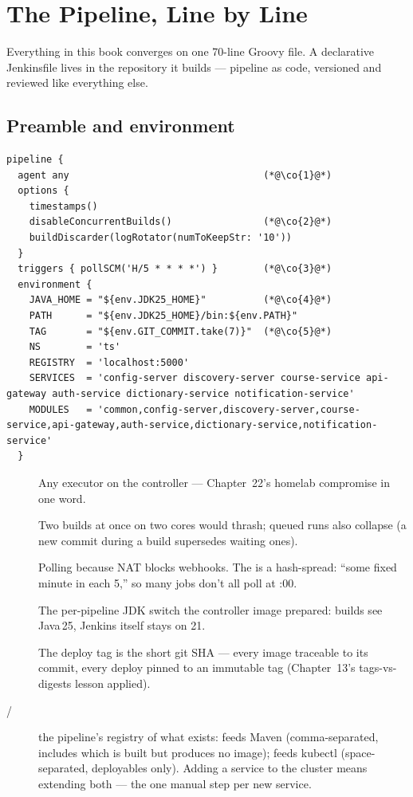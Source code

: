 \chapter{The Pipeline, Line by Line}
\label{ch:pipeline}

Everything in this book converges on one 70-line Groovy file. A
declarative Jenkinsfile lives in the repository it builds --- pipeline
as code, versioned and reviewed like everything else.

\section{Preamble and environment}

\begin{lstlisting}
pipeline {
  agent any                                  (*@\co{1}@*)
  options {
    timestamps()
    disableConcurrentBuilds()                (*@\co{2}@*)
    buildDiscarder(logRotator(numToKeepStr: '10'))
  }
  triggers { pollSCM('H/5 * * * *') }        (*@\co{3}@*)
  environment {
    JAVA_HOME = "${env.JDK25_HOME}"          (*@\co{4}@*)
    PATH      = "${env.JDK25_HOME}/bin:${env.PATH}"
    TAG       = "${env.GIT_COMMIT.take(7)}"  (*@\co{5}@*)
    NS        = 'ts'
    REGISTRY  = 'localhost:5000'
    SERVICES  = 'config-server discovery-server course-service api-gateway auth-service dictionary-service notification-service'
    MODULES   = 'common,config-server,discovery-server,course-service,api-gateway,auth-service,dictionary-service,notification-service'
  }
\end{lstlisting}

\begin{description}
  \item[] Any executor on the controller --- Chapter~22's
  homelab compromise in one word.
  \item[] Two builds at once on two cores would thrash; queued
  runs also collapse (a new commit during a build supersedes waiting
  ones).
  \item[] Polling because NAT blocks webhooks. The  is a
  hash-spread: ``some fixed minute in each 5,'' so many jobs don't all
  poll at :00.
  \item[] The per-pipeline JDK switch the controller image
  prepared: builds see Java\,25, Jenkins itself stays on 21.
  \item[] The deploy tag is the short git SHA --- every image
  traceable to its commit, every deploy pinned to an immutable tag
  (Chapter~13's tags-vs-digests lesson applied).
  \item[/] the pipeline's registry of what
  exists:  feeds Maven (comma-separated, includes
   which is built but produces no image);
   feeds kubectl (space-separated, deployables only).
  Adding a service to the cluster means extending both --- the one
  manual step per new service.
\end{description}

